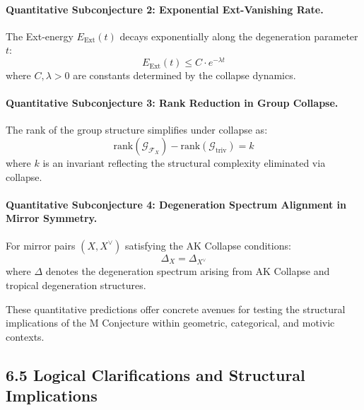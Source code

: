 \documentclass[11pt]{article}
\begin{document}
\vspace{1em}

\paragraph{Quantitative Subconjecture 2: Exponential Ext-Vanishing Rate.}

The Ext-energy $E_{\mathrm{Ext}}(t)$ decays exponentially along the degeneration parameter $t$:
\begin{equation}
E_{\mathrm{Ext}}(t) \leq C \cdot e^{-\lambda t}
\end{equation}
where $C, \lambda > 0$ are constants determined by the collapse dynamics.

\vspace{1em}

\paragraph{Quantitative Subconjecture 3: Rank Reduction in Group Collapse.}

The rank of the group structure simplifies under collapse as:
\begin{equation}
\mathrm{rank}(\mathcal{G}_{\mathcal{F}_X}) - \mathrm{rank}(\mathcal{G}_{\mathrm{triv}}) = k
\end{equation}
where $k$ is an invariant reflecting the structural complexity eliminated via collapse.

\vspace{1em}

\paragraph{Quantitative Subconjecture 4: Degeneration Spectrum Alignment in Mirror Symmetry.}

For mirror pairs $(X, X^\vee)$ satisfying the AK Collapse conditions:
\begin{equation}
\Delta_X = \Delta_{X^\vee}
\end{equation}
where $\Delta$ denotes the degeneration spectrum arising from AK Collapse and tropical degeneration structures.


These quantitative predictions offer concrete avenues for testing the structural implications of the M Conjecture within geometric, categorical, and motivic contexts.

\subsection{6.5 Logical Clarifications and Structural Implications}
\end{document}
